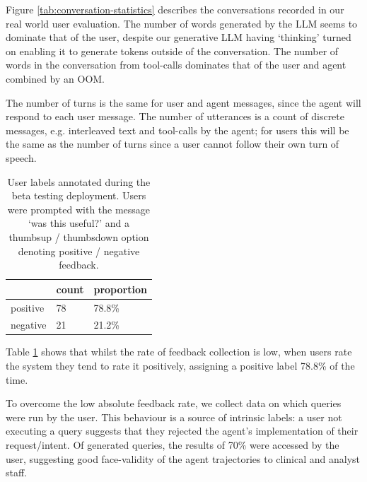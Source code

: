 \documentclass[11pt]{article}
\begin{document}
Figure \ref{tab:conversation-statistics} describes the conversations recorded in our real world user evaluation.
The number of words generated by the LLM seems to dominate that of the user, despite our generative LLM having `thinking' turned on enabling it to generate tokens outside of the conversation.
The number of words in the conversation from tool-calls dominates that of the user and agent combined by an OOM.

The number of turns is the same for user and agent messages, since the agent will respond to each user message.
The number of utterances is a count of discrete messages, e.g. interleaved text and tool-calls by the agent; for users this will be the same as the number of turns since a user cannot follow their own turn of speech.

\begin{table}[ht]
\centering
\begin{tabular}{|l|l|l|}
\hline
	            & count &  proportion \\	
\hline
	positive 	& 78 & 78.8\%	\\
\hline
	negative 	& 21 & 21.2\%\\
\hline
\end{tabular}
\caption{
	User labels annotated during the beta testing deployment.
	Users were prompted with the message `was this useful?' and a thumbsup / thumbsdown option denoting positive / negative feedback.\\
}
\label{tab:user-feedback}
\end{table}


Table \ref{tab:user-feedback} shows that whilst the rate of feedback collection is low, when users rate the system they tend to rate it positively, assigning a positive label 78.8\% of the time.

To overcome the low absolute feedback rate, we collect data on which queries were run by the user.
This behaviour is a source of intrinsic labels: a user not executing a query suggests that they rejected the agent's implementation of their request/intent.
Of generated queries, the results of 70\% were accessed by the user, suggesting good face-validity of the agent trajectories to clinical and analyst staff.
\end{document}
